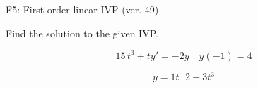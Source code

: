 \begin{exercise}
  \begin{exerciseTitle}F5: First order linear IVP (ver. 49)\end{exerciseTitle}
  \begin{exerciseStatement}
    
Find the solution to the given IVP.

    
\[15 \, t^{3} +ty'= -2 y \hspace{1em} y( -1 ) = 4\]

  \end{exerciseStatement}
  \begin{exerciseAnswer}
    
\[y= 1 t^ -2 -3 t^{3}\]

  \end{exerciseAnswer}
\end{exercise}